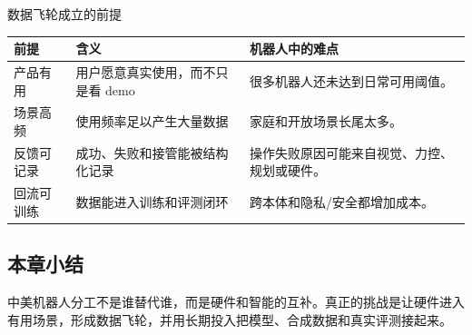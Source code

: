 \begin{knowledgebox}{数据飞轮成立的前提}
\begin{tabularx}{\textwidth}{p{}p{}X}
\toprule
前提 & 含义 & 机器人中的难点 \\
\midrule
产品有用 & 用户愿意真实使用，而不只是看 demo & 很多机器人还未达到日常可用阈值。 \\
场景高频 & 使用频率足以产生大量数据 & 家庭和开放场景长尾太多。 \\
反馈可记录 & 成功、失败和接管能被结构化记录 & 操作失败原因可能来自视觉、力控、规划或硬件。 \\
回流可训练 & 数据能进入训练和评测闭环 & 跨本体和隐私/安全都增加成本。 \\
\bottomrule
\end{tabularx}
\end{knowledgebox}

\subsection{本章小结}

中美机器人分工不是谁替代谁，而是硬件和智能的互补。真正的挑战是让硬件进入有用场景，形成数据飞轮，并用长期投入把模型、合成数据和真实评测接起来。

